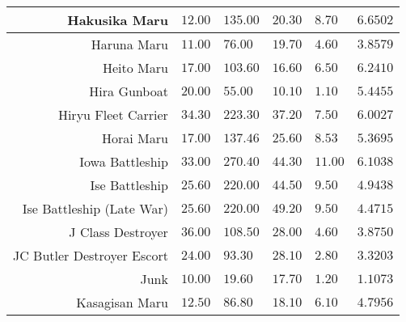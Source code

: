 \begin{tabularx}{\textwidth}{|r|l|l|l|l|X|}
\hline
Hakusika Maru & $12.00$ & $135.00$ & $20.30$ & $8.70$ & $6.6502$ \\
\hline
Haruna Maru & $11.00$ & $76.00$ & $19.70$ & $4.60$ & $3.8579$ \\
\hline
Heito Maru & $17.00$ & $103.60$ & $16.60$ & $6.50$ & $6.2410$ \\
\hline
Hira Gunboat & $20.00$ & $55.00$ & $10.10$ & $1.10$ & $5.4455$ \\
\hline
Hiryu Fleet Carrier & $34.30$ & $223.30$ & $37.20$ & $7.50$ & $6.0027$ \\
\hline
Horai Maru & $17.00$ & $137.46$ & $25.60$ & $8.53$ & $5.3695$ \\
\hline
Iowa Battleship & $33.00$ & $270.40$ & $44.30$ & $11.00$ & $6.1038$ \\
\hline
Ise Battleship & $25.60$ & $220.00$ & $44.50$ & $9.50$ & $4.9438$ \\
\hline
Ise Battleship (Late War) & $25.60$ & $220.00$ & $49.20$ & $9.50$ & $4.4715$ \\
\hline
J Class Destroyer & $36.00$ & $108.50$ & $28.00$ & $4.60$ & $3.8750$ \\
\hline
JC Butler Destroyer Escort & $24.00$ & $93.30$ & $28.10$ & $2.80$ & $3.3203$ \\
\hline
Junk & $10.00$ & $19.60$ & $17.70$ & $1.20$ & $1.1073$ \\
\hline
Kasagisan Maru & $12.50$ & $86.80$ & $18.10$ & $6.10$ & $4.7956$ \\
\hline
\end{tabularx}
\pagebreak

